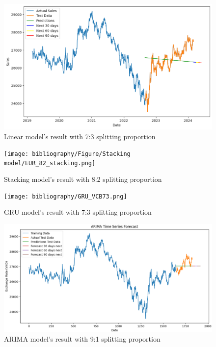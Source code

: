 \documentclass{ieeeojies}
\begin{document}
\begin{figure}[H]
  \centering
  \begin{minipage}{0.8\linewidth}
    \centering
    \includegraphics[width=\linewidth]{linear73_EUR.png}
    \caption{Linear model's result with 7:3 splitting proportion}
    \label{fig8}
  \end{minipage}
\end{figure}
\begin{figure}[H]
  \centering
  \begin{minipage}{0.8\linewidth}
    \centering
    \texttt{[image: bibliography/Figure/Stacking model/EUR\_82\_stacking.png]}
    \caption{Stacking model's result with 8:2 splitting proportion}
    \label{fig9}
  \end{minipage}
\end{figure}
\begin{figure}[H]
  \centering
  \begin{minipage}{0.8\linewidth}
    \centering
    \texttt{[image: bibliography/GRU\_VCB73.png]}
    \caption{GRU model's result with 7:3 splitting proportion}
    \label{fig10}
  \end{minipage}
\end{figure}
\begin{figure}[H]
  \centering
  \begin{minipage}{0.8\linewidth}
    \centering
    \includegraphics[width=\linewidth]{ARIMA_EUR.png}
    \caption{ARIMA model's result with 9:1 splitting proportion}
    \label{fig11}
  \end{minipage}
\end{figure}
\end{document}
